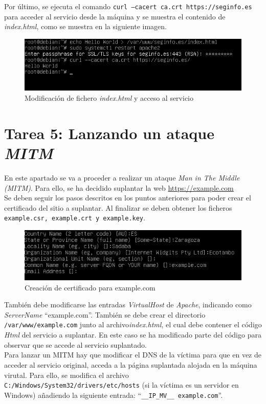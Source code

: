 \documentclass[10pt,a4paper]{article}
\begin{document}
Por último, se ejecuta el comando \texttt{curl --cacert ca.crt https://seginfo.es} para acceder al servicio desde la máquina y se muestra el contenido de \textit{index.html}, como se muestra en la siguiente imagen.\\
\begin{figure}[h!]
	\centering
	\includegraphics[scale=0.6]{images/tarea4_paso3.png}
	\caption{Modificación de fichero \textit{index.html} y acceso al servicio}
	\label{fig:tarea4_paso3}
\end{figure}


\section{Tarea 5: Lanzando un ataque \emph{MITM}}

En este apartado se va a proceder a realizar un ataque \textit{Man in The Middle (MITM)}. Para ello, se ha decidido suplantar la web \url{https://example.com}\\
Se deben seguir los pasos descritos en los puntos anteriores para poder crear el certificado del sitio a suplantar. Al finalizar se deben obtener los ficheros \texttt{example.csr, example.crt y example.key}.\\

\begin{figure}[h!]
	\centering
	\includegraphics[scale=0.6]{images/Tarea5_paso1.png}
	\caption{Creación de certificado para example.com}
	\label{fig:tarea5_paso1}
\end{figure}
También debe modificarse las entradas \textit{VirtualHost} de \textit{Apache}, indicando como \textit{ServerName} ``example.com''. 
También se debe crear el directorio \texttt{/var/www/example.com} junto al archivo\textit{index.html}, el cual debe contener el código \textit{Html} del servicio a suplantar. En este caso se ha modificado parte del código para observar que se accede al servicio suplantado.\\
Para lanzar un MITM hay que modificar el DNS de la víctima para que en vez de acceder al servicio original, acceda a la página suplantada alojada en la máquina virutal. Para ello, se modifica el archivo \texttt{C:/Windows/System32/drivers/etc/hosts} (si la víctima es un servidor en Windows) añadiendo la siguiente entrada: ``\texttt{\_\_IP\_MV\_\_ example.com}''.\\
\end{document}
